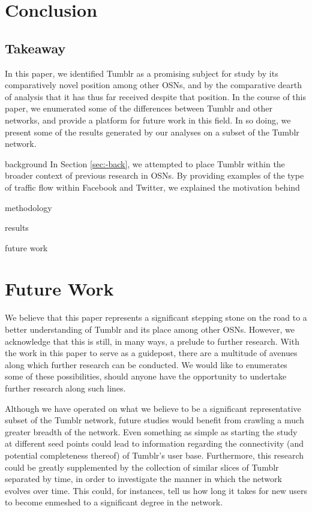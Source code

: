 \section{Conclusion}
\label{sec:-conc}
\subsection{Takeaway}

In this paper, we identified Tumblr as a promising subject for study 
by its comparatively novel position among other OSNs, and by the 
comparative dearth of analysis that it has thus far received despite 
that position.  In the course of this paper, we enumerated some of the 
differences between Tumblr and other networks, and provide a platform 
for future work in this field.  In so doing, we present some of the 
results generated by our analyses on a subset of the Tumblr network.


background
In Section \ref{sec:-back}, we attempted to place Tumblr within the 
broader context of previous research in OSNs.  By providing examples 
of the type of traffic flow within Facebook and Twitter, we explained 
the motivation behind

methodology


results


future work



\section{Future Work}
\label{sec:-fut}
We believe that this paper represents a significant stepping stone 
on the road to a better understanding of Tumblr and its place among 
other OSNs.  However, we acknowledge that this is still, in many ways, 
a prelude to further research.  With the work in this paper to serve as 
a guidepost, there are a multitude of avenues along which further 
research can be conducted.  We would like to enumerates some of these 
possibilities, should anyone have the opportunity to undertake further 
research along such lines.

Although we have operated on what we believe to be a significant 
representative subset of the Tumblr network, future studies would 
benefit from crawling a much greater breadth of the network.  Even 
something as simple as starting the study at different seed points
could lead to information regarding the connectivity (and potential 
completeness thereof) of Tumblr's user base.  Furthermore, this 
research could be greatly supplemented by the collection of similar 
slices of Tumblr separated by time, in order to investigate the manner 
in which the network evolves over time.  This could, for instances, 
tell us how long it takes for new users to become enmeshed to a 
significant degree in the network.


